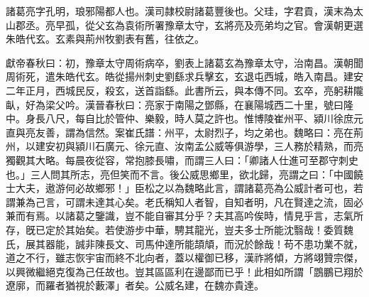 
\begin{pinyinscope}
諸葛亮字孔明，琅邪陽都人也。漢司隷校尉諸葛豐後也。父珪，字君貢，漢末為太山郡丞。亮早孤，從父玄為袁術所署豫章太守，玄將亮及亮弟均之官。會漢朝更選朱皓代玄。玄素與荊州牧劉表有舊，往依之。

獻帝春秋曰：初，豫章太守周術病卒，劉表上諸葛玄為豫章太守，治南昌。漢朝聞周術死，遣朱皓代玄。皓從揚州刺史劉繇求兵擊玄，玄退屯西城，皓入南昌。建安二年正月，西城民反，殺玄，送首詣繇。此書所云，與本傳不同。玄卒，亮躬耕隴畒，好為梁父吟。漢晉春秋曰：亮家于南陽之鄧縣，在襄陽城西二十里，號曰隆中。身長八尺，每自比於管仲、樂毅，時人莫之許也。惟博陵崔州平、潁川徐庶元直與亮友善，謂為信然。案崔氏譜：州平，太尉烈子，均之弟也。魏略曰：亮在荊州，以建安初與潁川石廣元、徐元直、汝南孟公威等俱游學，三人務於精熟，而亮獨觀其大略。每晨夜從容，常抱膝長嘯，而謂三人曰：「卿諸人仕進可至郡守刺史也。」三人問其所志，亮但笑而不言。後公威思鄉里，欲北歸，亮謂之曰：「中國饒士大夫，遨游何必故鄉邪！」臣松之以為魏略此言，謂諸葛亮為公威計者可也，若謂兼為己言，可謂未達其心矣。老氏稱知人者智，自知者明，凡在賢達之流，固必兼而有焉。以諸葛之鑒識，豈不能自審其分乎？夫其高吟俟時，情見乎言，志氣所存，旣已定於其始矣。若使游步中華，騁其龍光，豈夫多士所能沈翳哉！委質魏氏，展其器能，誠非陳長文、司馬仲達所能頡頏，而況於餘哉！苟不患功業不就，道之不行，雖志恢宇宙而終不北向者，蓋以權御已移，漢祚將傾，方將翊贊宗傑，以興微繼絕克復為己任故也。豈其區區利在邊鄙而已乎！此相如所謂「鵾鵬已翔於遼廓，而羅者猶視於藪澤」者矣。公威名建，在魏亦貴達。


\end{pinyinscope}
